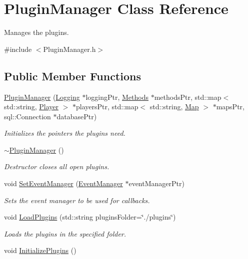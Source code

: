 \hypertarget{classPluginManager}{\section{Plugin\-Manager Class Reference}
\label{classPluginManager}
}


Manages the plugins.  




{\ttfamily \#include $<$Plugin\-Manager.\-h$>$}

\subsection*{Public Member Functions}
\begin{DoxyCompactItemize}
\item 
\hyperlink{classPluginManager_a631670792320a0a41c0ae83e1b153547}{Plugin\-Manager} (\hyperlink{classLogging}{Logging} $\ast$logging\-Ptr, \hyperlink{classMethods}{Methods} $\ast$methods\-Ptr, std\-::map$<$ std\-::string, \hyperlink{structPlayer}{Player} $>$ $\ast$players\-Ptr, std\-::map$<$ std\-::string, \hyperlink{structMap}{Map} $>$ $\ast$maps\-Ptr, sql\-::\-Connection $\ast$database\-Ptr)
\begin{DoxyCompactList}\small\item\em Initializes the pointers the plugins need. \end{DoxyCompactList}\item 
\hypertarget{classPluginManager_ab657302ef5af357907ae11ad817f5dfc}{\hyperlink{classPluginManager_ab657302ef5af357907ae11ad817f5dfc}{$\sim$\-Plugin\-Manager} ()}\label{classPluginManager_ab657302ef5af357907ae11ad817f5dfc}

\begin{DoxyCompactList}\small\item\em Destructor closes all open plugins. \end{DoxyCompactList}\item 
void \hyperlink{classPluginManager_a7ed7485291babeed3109a1a364b6d308}{Set\-Event\-Manager} (\hyperlink{classEventManager}{Event\-Manager} $\ast$event\-Manager\-Ptr)
\begin{DoxyCompactList}\small\item\em Sets the event manager to be used for callbacks. \end{DoxyCompactList}\item 
void \hyperlink{classPluginManager_a0ff203ba125f85688fa752bf789418f0}{Load\-Plugins} (std\-::string plugins\-Folder=\char`\"{}./plugins\char`\"{})
\begin{DoxyCompactList}\small\item\em Loads the plugins in the specified folder. \end{DoxyCompactList}\item 
\hypertarget{classPluginManager_aba7e19d75b25ca1a91b92d95b173240f}{void \hyperlink{classPluginManager_aba7e19d75b25ca1a91b92d95b173240f}{Initialize\-Plugins} ()}\label{classPluginManager_aba7e19d75b25ca1a91b92d95b173240f}


\end{DoxyCompactItemize}
